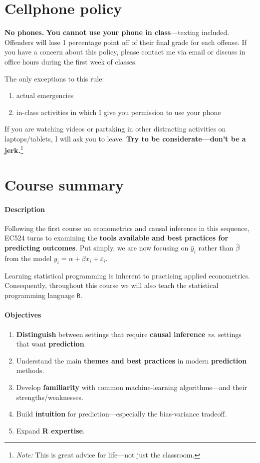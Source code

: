 \documentclass[10pt]{article}
\newcommand{\emf}[1]{\textbf{\textcolor{grass_green}{#1}}}
\begin{document}
\section*{Cellphone policy}

\textbf{No phones.} \emf{You cannot use your phone in class}---texting included. Offenders will lose 1 percentage point off of their final grade for each offense. If you have a concern about this policy, please contact me via email or discuss in office hours during the first week of classes.

\bigskip \noindent The only exceptions to this rule:
\begin{enumerate}
  \item actual emergencies
  \item in-class activities in which I give you permission to use your phone
\end{enumerate}
If you are watching videos or partaking in other distracting activities on laptops/tablets, I will ask you to leave. \emf{Try to be considerate---don't be a jerk.}\footnote{\textit{Note:} This is great advice for life---not just the classroom.}

\newpage

\section*{Course summary}

\paragraph{Description} Following the first course on econometrics and causal inference in this sequence, EC524 turns to examining the \emf{tools available and best practices for predicting outcomes}. Put simply, we are now focusing on $\hat{y}_i$ rather than $\hat{\beta}$ from the model $y_i = \alpha + \beta x_i + \varepsilon_i$.

Learning statistical programming is inherent to practicing applied econometrics. Consequently, throughout this course we will also teach the statistical programming language \texttt{R}.

\paragraph{Objectives}

\begin{enumerate}
  \item \emf{Distinguish} between settings that require \emf{causal inference} \textit{vs.} settings that want \emf{prediction}.
  \item Understand the main \emf{themes and best practices} in modern \emf{prediction} methods.
  \item Develop \emf{familiarity} with common machine-learning algorithms---and their strengths/weaknesses.
  \item Build \emf{intuition} for prediction---especially the bias-variance tradeoff.
  \item Expand \emf{R expertise}.
\end{enumerate}
\end{document}
